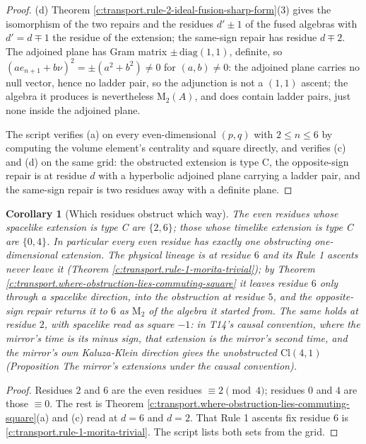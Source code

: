 \documentclass[11pt]{article}
\newtheorem{corollary}[theorem]{Corollary}
\theoremstyle{definition}
\theoremstyle{plain}
\newcommand{\changedmark}[2]{\marginpar{\raggedright\scriptsize\color{#1}#2}}
\providecommand{\Cl}{}\renewcommand{\Cl}{\mathrm{Cl}}
\providecommand{\Mat}{}\renewcommand{\Mat}{\mathrm{M}}
\begin{document}
\begin{proof}
(d) Theorem \ref{c:transport.rule-2-ideal-fusion-sharp-form}(3) gives the isomorphism of the two repairs and the residues $d' \pm 1$ of the fused algebras with $d' = d \mp 1$ the residue of the extension; the same-sign repair has residue $d \mp 2$. The adjoined plane has Gram matrix $\pm\,\mathrm{diag}(1,1)$, definite, so $(a e_{n+1} + b\nu)^2 = \pm(a^2 + b^2) \neq 0$ for $(a,b) \neq 0$: the adjoined plane carries no null vector, hence no ladder pair, so the adjunction is not a $(1,1)$ ascent; the algebra it produces is nevertheless $\Mat_2(A)$, and does contain ladder pairs, just none inside the adjoined plane.

The script verifies (a) on every even-dimensional $(p,q)$ with $2 \leq n \leq 6$ by computing the volume element's centrality and square directly, and verifies (c) and (d) on the same grid: the obstructed extension is type C, the opposite-sign repair is at residue $d$ with a hyperbolic adjoined plane carrying a ladder pair, and the same-sign repair is two residues away with a definite plane.

\end{proof}

\begin{corollary}[Which residues obstruct which way]\label{c:transport.which-residues-obstruct-which-way}
\changedmark{BurntOrange}{changed since the deposit}
The even residues whose spacelike extension is type C are $\{2, 6\}$; those whose timelike extension is type C are $\{0, 4\}$. In particular every even residue has exactly one obstructing one-dimensional extension. The physical lineage is at residue $6$ and its Rule 1 ascents never leave it (Theorem \ref{c:transport.rule-1-morita-trivial}); by Theorem \ref{c:transport.where-obstruction-lies-commuting-square} it leaves residue $6$ only through a spacelike direction, into the obstruction at residue $5$, and the opposite-sign repair returns it to $6$ as $\Mat_2$ of the algebra it started from. The same holds at residue $2$, with spacelike read as square $-1$: in T14's causal convention, where the mirror's time is its minus sign, that extension is the mirror's second time, and the mirror's own Kaluza-Klein direction gives the unobstructed $\Cl(4,1)$ (Proposition \emph{The mirror's extensions under the causal convention}).
\end{corollary}
\begin{proof}
Residues $2$ and $6$ are the even residues $\equiv 2 \pmod 4$; residues $0$ and $4$ are those $\equiv 0$. The rest is Theorem \ref{c:transport.where-obstruction-lies-commuting-square}(a) and (c) read at $d = 6$ and $d = 2$. That Rule 1 ascents fix residue $6$ is \ref{c:transport.rule-1-morita-trivial}. The script lists both sets from the grid.

\end{proof}
\end{document}
